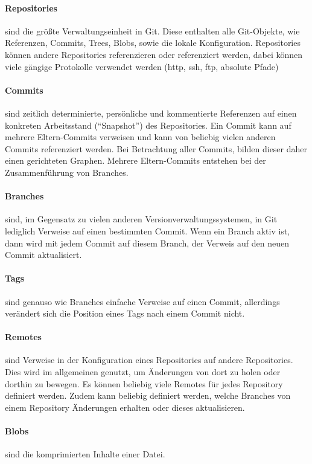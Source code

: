 \paragraph{Repositories} sind die größte Verwaltungseinheit in Git. Diese enthalten alle Git-Objekte, wie Referenzen, 
Commits, Trees, Blobs, sowie die lokale Konfiguration. Repositories können andere Repositories referenzieren oder 
referenziert werden, dabei können viele gängige Protokolle verwendet werden (http, ssh, ftp, absolute Pfade)

\paragraph{Commits} sind zeitlich determinierte, persönliche und kommentierte Referenzen auf einen konkreten Arbeitsstand 
(``Snapshot'') des Repositories. Ein Commit kann auf mehrere Eltern-Commits verweisen und kann von beliebig vielen 
anderen Commits referenziert werden. Bei Betrachtung aller Commits, bilden dieser daher einen gerichteten Graphen. 
Mehrere Eltern-Commits entstehen bei der Zusammenführung von Branches.

\paragraph{Branches} sind, im Gegensatz zu vielen anderen Versionverwaltungssystemen, in Git lediglich Verweise auf einen 
bestimmten Commit. Wenn ein Branch aktiv ist, dann wird mit jedem Commit auf diesem Branch, der Verweis auf den neuen 
Commit aktualisiert.

\paragraph{Tags} sind genauso wie Branches einfache Verweise auf einen Commit, allerdings verändert sich die Position 
eines Tags nach einem Commit nicht.

\paragraph{Remotes} sind Verweise in der Konfiguration eines Repositories auf andere Repositories. Dies wird im 
allgemeinen genutzt, um Änderungen von dort zu holen oder dorthin zu bewegen. Es können beliebig viele Remotes für jedes 
Repository definiert werden. Zudem kann beliebig definiert werden, welche Branches von einem Repository Änderungen 
erhalten oder dieses aktualisieren.

\paragraph{Blobs} sind die komprimierten Inhalte einer Datei.

